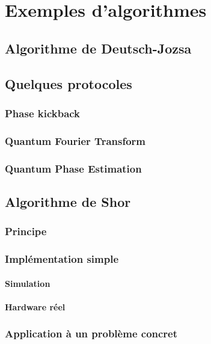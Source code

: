\part{Exemples d'algorithmes}
\chapter{Algorithme de Deutsch-Jozsa}

\chapter{Quelques protocoles}

\section{Phase kickback}

\section{Quantum Fourier Transform}

\section{Quantum Phase Estimation}

\chapter{Algorithme de Shor}

\section{Principe}

\section{Implémentation simple}

\subsection{Simulation}

\subsection{Hardware réel}

\section{Application à un problème concret}

